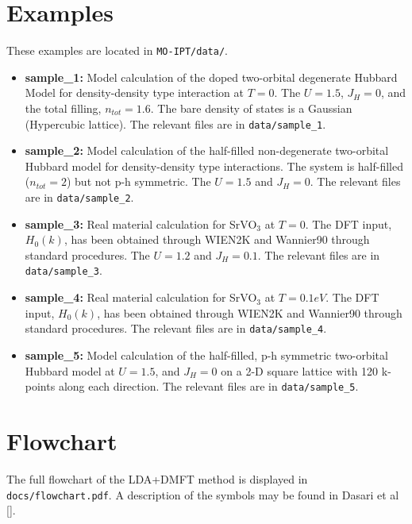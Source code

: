 \documentclass[a4paper]{article}
\begin{document}
\section{Examples}

These examples are located in {\tt MO-IPT/data/}.
\begin{itemize}


\item{\bf sample\_1:} Model calculation of the doped two-orbital degenerate Hubbard Model for density-density type interaction
at $T=0$. The $U=1.5$, $J_H=0$, and the total filling, $n_{tot}=1.6$. The bare
density of states is a Gaussian (Hypercubic lattice). The relevant files are in
{\tt data/sample\_1}.

\item{\bf sample\_2:} Model calculation of the half-filled non-degenerate two-orbital Hubbard model for density-density type interactions. The system is half-filled 
($n_{tot}=2$) but not p-h symmetric. The $U=1.5$ and $J_H=0$. The relevant files are in
{\tt data/sample\_2}.

\item{\bf sample\_3:} Real material calculation for SrVO$_3$ at $T=0$. The DFT input, $H_0(k)$, has been obtained through WIEN2K and Wannier90 through standard procedures.
The $U=1.2$ and $J_H=0.1$. The relevant files are in
{\tt data/sample\_3}.

\item{\bf sample\_4:} Real material calculation for SrVO$_3$ at $T=0.1 eV$. The DFT input, $H_0(k)$, has been obtained through WIEN2K and Wannier90 through standard procedures.
The relevant files are in
{\tt data/sample\_4}.

\item{\bf sample\_5:} Model calculation of the half-filled, p-h symmetric 
two-orbital Hubbard model at $U=1.5$, and $J_H=0$ on a 2-D square lattice
with 120 k-points along each direction.
The relevant files are in
{\tt data/sample\_5}.
\end{itemize}

\section{Flowchart}

The full flowchart of the LDA+DMFT method is displayed in {\tt docs/flowchart.pdf}. A description of the symbols may be found in 
Dasari et al [].
\end{document}
